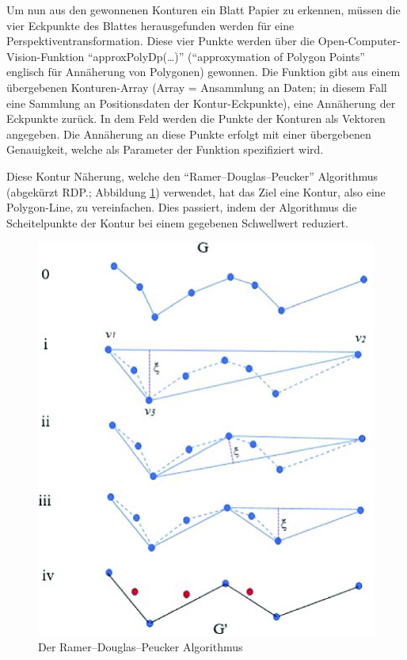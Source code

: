 
Um nun aus den gewonnenen Konturen ein Blatt Papier zu erkennen, müssen die vier Eckpunkte des Blattes herausgefunden werden für eine Perspektiventransformation. Diese vier Punkte werden über die Open-Computer-Vision-Funktion ``approxPolyDp(\dots)'' (``approxymation of Polygon Points'' englisch für Annäherung von Polygonen) gewonnen. Die Funktion gibt aus einem übergebenen Konturen-Array (Array = Ansammlung an Daten; in diesem Fall eine Sammlung an Positionsdaten der Kontur-Eckpunkte), eine Annäherung der Eckpunkte zurück. In dem Feld werden die Punkte der Konturen als Vektoren angegeben. Die Annäherung an diese Punkte erfolgt mit einer übergebenen Genauigkeit, welche als Parameter der Funktion spezifiziert wird.

Diese Kontur Näherung, welche den ``Ramer–Douglas–Peucker'' Algorithmus (abgekürzt RDP.; Abbildung \ref{fig:map:rdpalgo}) verwendet, hat das Ziel eine Kontur, also eine Polygon-Line, zu vereinfachen. Dies passiert, indem der Algorithmus die Scheitelpunkte der Kontur bei einem gegebenen Schwellwert reduziert.


\begin{figure}[H]
    \centering
    \includegraphics[scale=0.5]{pics/bildverarbeitungsalgos/The-Ramer-Douglas-Peucker-algorithm.png}
    \caption{Der Ramer–Douglas–Peucker Algorithmus \cite{maai:rdpa:cite}}
    \label{fig:map:rdpalgo}
\end{figure}

